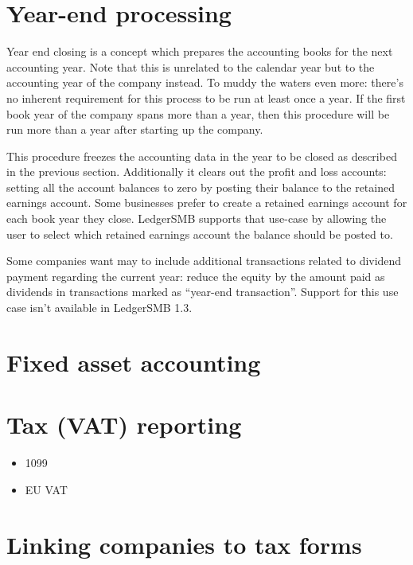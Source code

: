 \section{Year-end processing}
\label{sec:YearEndProcessing}

Year end closing is a concept which prepares the accounting books for the next
accounting year. Note that this is unrelated to the calendar year but to the
accounting year of the company instead. To muddy the waters even more: there's
no inherent requirement for this process to be run at least once a year. If the
first book year of the company spans more than a year, then this procedure will
be run more than a year after starting up the company.

This procedure freezes the accounting data in the year to be closed as described
in the previous section. Additionally it clears out the profit and loss accounts:
setting all the account
balances to zero by posting their balance to the retained earnings account. Some
businesses prefer to create a retained earnings account for each book year they
close. LedgerSMB supports that use-case by allowing the user to select which
retained earnings account the balance should be posted to.

Some companies want may to include additional transactions related to dividend
payment regarding the current year: reduce the equity by the amount paid as
dividends in transactions marked as ``year-end transaction''. Support
for this use case isn't available in LedgerSMB 1.3.




\section{Fixed asset accounting}
\label{sec:FixedAssetAccounting}


\section{Tax (VAT) reporting}



\begin{itemize}
\item 1099
\item EU VAT
\end{itemize}


\section{Linking companies to tax forms}


